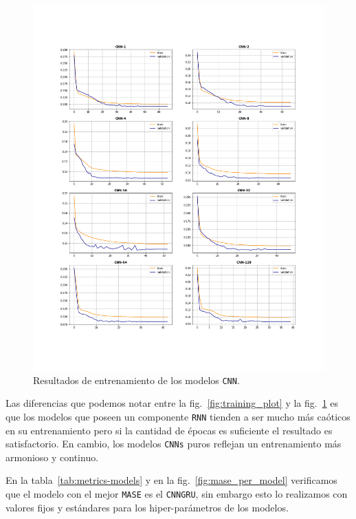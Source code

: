 \documentclass[a4paper,12pt]{article}
\begin{document}
\begin{figure}[H]
	\begin{center}
	\includegraphics[width=1\textwidth]{train_cnn.png}
  	\caption{Resultados de entrenamiento de los modelos \texttt{CNN}.}
  	\label{fig:train_cnn}
  	\end{center}
\end{figure}

Las diferencias que podemos notar entre la fig.~\ref{fig:training_plot} y la fig.~\ref{fig:train_cnn} es que los modelos que poseen un componente \texttt{RNN} tienden a ser mucho más caóticos en su entrenamiento pero si la cantidad de épocas es suficiente el resultado es satisfactorio. En cambio, los modelos \texttt{CNNs} puros reflejan un entrenamiento más armonioso y continuo.

En la tabla~\ref{tab:metrics-models} y en la fig.~\ref{fig:mase_per_model} verificamos que el modelo con el mejor \texttt{MASE} es el \texttt{CNNGRU}, sin embargo esto lo realizamos con valores fijos y estándares para los hiper-parámetros de los modelos.
\end{document}
